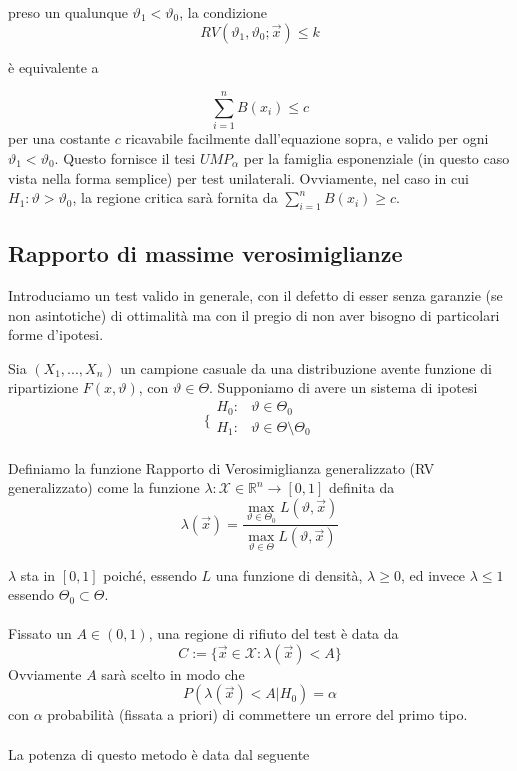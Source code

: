preso un qualunque $\vartheta_1 < \vartheta_0$, la condizione 
$$RV(\vartheta_1,\vartheta_0;\vec{x}) \leq k$$

è equivalente a 

$$\sum_{i=1}^n B(x_i) \leq c$$ per una costante $c$ ricavabile facilmente dall'equazione sopra, e valido per ogni $\vartheta_1 < \vartheta_0$. Questo fornisce il tesi $UMP_\alpha$
per la famiglia esponenziale (in questo caso vista nella forma semplice) per test unilaterali. Ovviamente, nel caso in cui $H_1: \vartheta > \vartheta_0$, la regione critica sarà fornita da $\sum_{i=1}^n B(x_i) \geq c$.\\

\subsection{Rapporto di massime verosimiglianze}

Introduciamo un test valido in generale, con il defetto di esser senza garanzie (se non asintotiche) di ottimalità ma con il pregio di non aver bisogno di particolari forme d'ipotesi. 

\begin{definizione}
Sia $(X_1,...,X_n)$ un campione casuale da una distribuzione avente funzione di ripartizione $F(x,\vartheta)$, con $\vartheta \in \Theta$.
Supponiamo di avere un sistema di ipotesi
$$\bigg \{
\begin{array}{rl}
H_0: & \vartheta \in \Theta_0 \\
H_1: & \vartheta \in \Theta \setminus \Theta_0 \\
\end{array}
$$

Definiamo la funzione Rapporto di Verosimiglianza generalizzato (RV generalizzato) come la funzione $\lambda: \mathcal{X} \in \mathbb{R}^n \to [0,1]$
definita da
$$\lambda(\vec{x}) = \frac{\max_{\vartheta \in \Theta_0} L(\vartheta,\vec{x})}{\max_{\vartheta \in \Theta} L(\vartheta,\vec{x})}$$
\end{definizione}

$\lambda$ sta in $[0,1]$ poiché, essendo $L$ una funzione di densità, $\lambda \geq 0$, ed invece $\lambda \leq 1$ essendo $\Theta_0 \subset \Theta$.\\
\\
Fissato un $A \in (0,1)$, una regione di rifiuto del test è data da 
$$C := \{ \vec{x} \in \mathcal{X}: \lambda(\vec{x})<A \}$$
Ovviamente $A$ sarà scelto in modo che 
$$P(\lambda(\vec{x})<A | H_0) = \alpha$$
con $\alpha$ probabilità (fissata a priori) di commettere un errore del primo tipo.\\
\\
La potenza di questo metodo è data dal seguente

